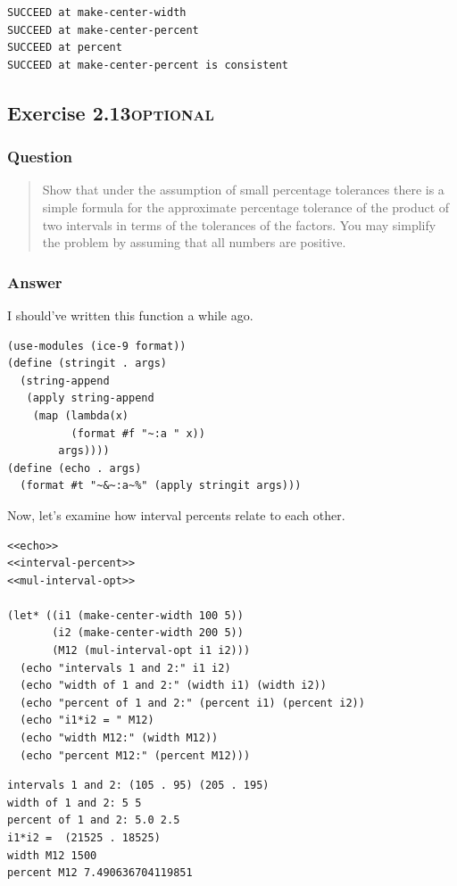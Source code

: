 \documentclass[final,fleqn,titlepage,twoside]{article}
\begin{document}
\begin{verbatim}
SUCCEED at make-center-width
SUCCEED at make-center-percent
SUCCEED at percent
SUCCEED at make-center-percent is consistent
\end{verbatim}

\subsection{Exercise 2.13\hfill{}\textsc{optional}}
\label{sec:org1df933f}
\subsubsection{Question}
\label{sec:org47b8ce2}
\begin{quote}
Show that under the assumption of small percentage tolerances there is a simple
formula for the approximate percentage tolerance of the product of two intervals
in terms of the tolerances of the factors. You may simplify the problem by
assuming that all numbers are positive.
\end{quote}

\subsubsection{Answer}
\label{sec:orgb912ea1}
I should've written this function a while ago.
\begin{verbatim}
(use-modules (ice-9 format))
(define (stringit . args)
  (string-append
   (apply string-append
    (map (lambda(x)
          (format #f "~:a " x))
        args))))
(define (echo . args)
  (format #t "~&~:a~%" (apply stringit args)))
\end{verbatim}

Now, let's examine how interval percents relate to each other.

\begin{verbatim}
<<echo>>
<<interval-percent>>
<<mul-interval-opt>>

(let* ((i1 (make-center-width 100 5))
       (i2 (make-center-width 200 5))
       (M12 (mul-interval-opt i1 i2)))
  (echo "intervals 1 and 2:" i1 i2)
  (echo "width of 1 and 2:" (width i1) (width i2))
  (echo "percent of 1 and 2:" (percent i1) (percent i2))
  (echo "i1*i2 = " M12)
  (echo "width M12:" (width M12))
  (echo "percent M12:" (percent M12)))
\end{verbatim}

\begin{verbatim}
intervals 1 and 2: (105 . 95) (205 . 195) 
width of 1 and 2: 5 5 
percent of 1 and 2: 5.0 2.5 
i1*i2 =  (21525 . 18525) 
width M12 1500 
percent M12 7.490636704119851 
\end{verbatim}
\end{document}
